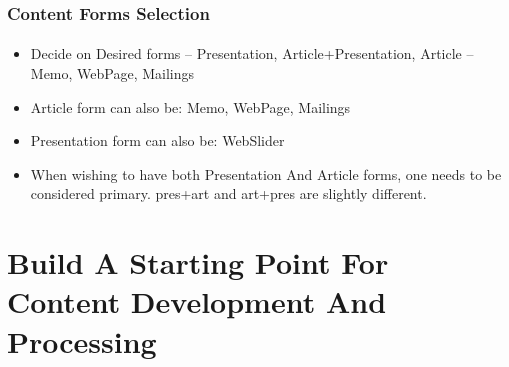 \begin{comment}
*****  [[elisp:(org-cycle)][| ]]  [[elisp:(blee:ppmm:org-mode-toggle)][Nat]] [[elisp:(beginning-of-buffer)][Top]] [[elisp:(delete-other-windows)][(1)]] || /Frame/ *Label=ContentFormsSelection*  Content Forms Selection ::  [[elisp:(org-cycle)][| ]]
\end{comment}

\begin{frame}[fragile,label=ContentFormsSelection]
    \frametitle{Content Forms Selection}
    \framesubtitle{}

\begin{itemize}
\item Decide on Desired forms -- Presentation, Article+Presentation, Article --  Memo, WebPage, Mailings
\item Article form can also be: Memo, WebPage, Mailings
\item Presentation form can also be: WebSlider
\item When wishing to have both Presentation And Article forms, one needs to be considered primary.
  pres+art and art+pres are slightly different.
\end{itemize}

\end{frame}


\begin{comment}
*  [[elisp:(org-cycle)][| ]] [[elisp:(org-show-subtree)][|=]] [[elisp:(show-children 10)][|V]] [[elisp:(bx:orgm:indirectBufOther)][|>]] [[elisp:(bx:orgm:indirectBufMain)][|I]] [[elisp:(blee:ppmm:org-mode-toggle)][|N]] [[elisp:(org-top-overview)][|O]] [[elisp:(progn (org-shifttab) (org-content))][|C]] [[elisp:(delete-other-windows)][|1]]  /Section/   Build A Starting Point For Content Development And Processing ::  [[elisp:(org-cycle)][| ]]
\end{comment}

\section{Build A Starting Point For Content Development And Processing}

